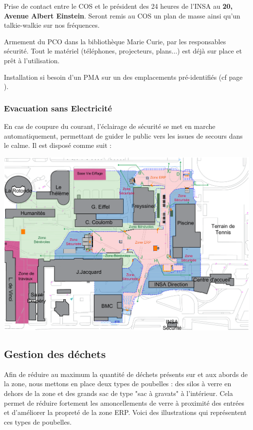 \documentclass[hidelinks, paper=a4, fontsize=13pt]{report}
\begin{document}
\begin{list}{•}{}
	\item Prise de contact entre le COS et le président des 24 heures de l'INSA au \textbf{20, Avenue Albert Einstein}. Seront remis au COS un plan de masse ainsi qu’un talkie-walkie sur nos fréquences.
	\item Armement du PCO dans la bibliothèque Marie Curie, par les responsables sécurité. Tout le matériel (téléphones, projecteurs, plans...) est déjà sur place et prêt à l'utilisation. 
	\item Installation si besoin d’un PMA sur un des emplacements pré-identifiés (cf page \pageref{refEmplacementPMA}).
\end{list}


\subsubsection{Evacuation sans Electricité}
En cas de coupure du courant, l’éclairage de sécurité se met en marche automatiquement, permettant de guider le public vers les issues de secours dans le calme. Il est disposé comme suit :
\begin{center}
	\includegraphics[width=.8\textwidth,keepaspectratio]{Exports/Plan_24h_45eme-Blocs_Phares}
\end{center}

\subsection{Gestion des déchets}
\label{gestion_dechets}

Afin de réduire au maximum la quantité de déchets présents sur et aux abords de la zone, nous mettons en place deux types de poubelles : des silos à verre en dehors de la zone et des grands sac de type "sac à gravats" à l'intérieur. Cela permet de réduire fortement les amoncellements de verre à proximité des entrées et d'améliorer la propreté de la zone ERP. Voici des illustrations qui représentent ces types de poubelles.
\end{document}
